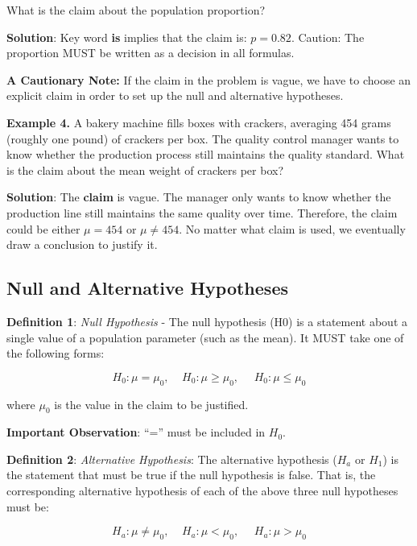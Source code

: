 \documentclass[
]{book}
\begin{document}
What is the claim about the population proportion?

\textbf{Solution}: Key word \textbf{is} implies that the claim is: \(p = 0.82\). Caution: The proportion MUST be written as a decision in all formulas.

\hfill\break

\textbf{A Cautionary Note:} If the claim in the problem is vague, we have to choose an explicit claim in order to set up the null and alternative hypotheses.

\hfill\break
\textbf{Example 4. } A bakery machine fills boxes with crackers, averaging 454 grams (roughly one pound) of crackers per box. The quality control manager wants to know whether the production process still maintains the quality standard. What is the claim about the mean weight of crackers per box?

\textbf{Solution}: The \textbf{claim} is vague. The manager only wants to know whether the production line still maintains the same quality over time. Therefore, the claim could be either \(\mu =454\) or \(\mu \ne 454\). No matter what claim is used, we eventually draw a conclusion to justify it.

\hfill\break

\hypertarget{null-and-alternative-hypotheses}{%
\subsection{Null and Alternative Hypotheses}\label{null-and-alternative-hypotheses}}

\textbf{Definition 1}: \emph{Null Hypothesis} - The null hypothesis (H0) is a statement about a single value of a population parameter (such as the mean). It MUST take one of the following forms:

\[H_0:   \mu = \mu_0 ,  \ \ \ \ \       H_0:  \mu \ge \mu_0,    \ \ \ \ \ \       H_0: \mu \le \mu_0\]

where \(\mu_0\) is the value in the claim to be justified.

\textbf{Important Observation}: ``='' must be included in \(H_0\).

\textbf{Definition 2}: \emph{Alternative Hypothesis}: The alternative hypothesis (\(H_a\) or \(H_1\)) is the statement that must be true if the null hypothesis is false. That is, the corresponding alternative hypothesis of each of the above three null hypotheses must be:

\[H_a:   \mu \ne \mu_0 ,  \ \ \ \ \       H_a:  \mu < \mu_0,    \ \ \ \ \ \       H_a: \mu > \mu_0\]
\end{document}
